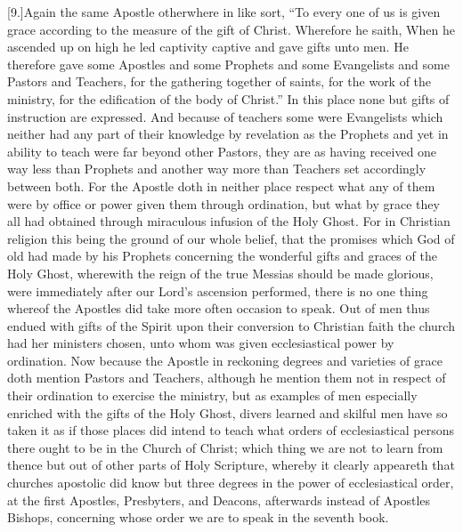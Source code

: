 [9.]Again the same Apostle otherwhere in like sort, “To every one of us is given grace according to the measure of the gift of Christ. Wherefore he saith, When he ascended up on high he led captivity captive and gave gifts unto men. He therefore gave some Apostles and some Prophets and some Evangelists and some Pastors and Teachers, for the gathering together of saints, for the work of the ministry, for the edification of the body of Christ.” In this place  none but gifts of instruction are expressed.
 And because of teachers some were Evangelists which neither had any part of their knowledge by revelation as the Prophets and yet in ability to teach were far beyond other Pastors, they are as having received one way less than Prophets and another way more than Teachers set accordingly between both. For the Apostle doth in neither place respect what any of them were by office or power given them through ordination, but what by grace they all had obtained through miraculous infusion of the Holy Ghost. For in Christian religion this being the ground of our whole belief, that the promises which God of old had made by his Prophets concerning the wonderful gifts and graces of the Holy Ghost, wherewith the reign of the true Messias should be made glorious, were immediately after our Lord’s ascension performed, there is no one thing whereof the Apostles did take more often occasion to speak. Out of men thus endued with gifts of the Spirit upon their conversion to Christian faith the church had her ministers chosen, unto whom was given ecclesiastical power by ordination. Now because the Apostle in reckoning degrees and varieties of grace doth mention Pastors and Teachers, although he mention them not in respect of their ordination to exercise the ministry, but as examples of men especially enriched with the gifts of the Holy Ghost, divers learned and skilful men have so taken it as if those places did intend to teach what orders of ecclesiastical persons there ought to be in the Church of Christ; which thing we are not to learn from thence but out of other parts of Holy Scripture, whereby it clearly appeareth that churches apostolic did know but three degrees in the power of ecclesiastical order, at the first Apostles, Presbyters, and Deacons, afterwards instead of Apostles Bishops, concerning whose order we are to speak in the seventh book.

